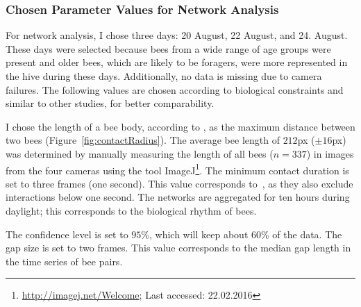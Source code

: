 \subsubsection{Chosen Parameter Values for Network Analysis}
For network analysis, I chose three days: 20 August, 22 August, and 24. August.
These days were selected because bees from a wide range of age groups were present and older bees, which are likely to be foragers, were more represented in the hive during these days.
Additionally, no data is missing due to camera failures.
The following values are chosen according to biological constraints and similar to other studies, for better comparability.

I chose the length of a bee body, according to \textcite{baracchi2014socio}, as the maximum distance between two bees (Figure~\ref{fig:contactRadius}).
The average bee length of $212$px ($\pm 16$px)  was determined by manually measuring the length of all bees ($n=337$) in images from the four cameras using the tool ImageJ\footnote{\url{http://imagej.net/Welcome}; Last accessed:
 22.02.2016}.
The minimum contact duration is set to three frames (one second). This value corresponds to~\textcite{mersch2013tracking}, as they also exclude interactions below one second.
The networks are aggregated for ten hours during daylight; this corresponds to the biological rhythm of bees.

The confidence level is set to $95\%$, which will keep about 60\% of the data.
The gap size is set to two frames. This value corresponds to the median gap length in the time series of bee pairs.

